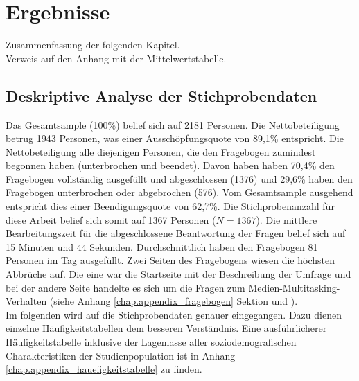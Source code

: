 %
%
\let\raggedsection\centering 
\chapter{Ergebnisse}
\let\raggedsection\raggedright 
\glsresetall
Zusammenfassung der folgenden Kapitel.\\
Verweis auf den Anhang mit der Mittelwertstabelle.
\section{Deskriptive Analyse der Stichprobendaten}
\label{label.stichprobe}
Das Gesamtsample (100\%) belief sich auf 2181 Personen. Die Nettobeteiligung betrug 1943 Personen, was einer Ausschöpfungsquote von 89,1\% entspricht. Die Nettobeteiligung alle diejenigen Personen, die den Fragebogen zumindest begonnen haben (unterbrochen und beendet). Davon haben haben 70,4\% den Fragebogen vollständig ausgefüllt und abgeschlossen (1376) und 29,6\% haben den Fragebogen unterbrochen oder abgebrochen (576). Vom Gesamtsample ausgehend entspricht dies einer Beendigungsquote von 62,7\%. Die Stichprobenanzahl für diese Arbeit belief sich somit auf 1367 Personen ($N = 1367$). Die mittlere Bearbeitungszeit für die abgeschlossene Beantwortung der Fragen belief sich auf 15 Minuten und 44 Sekunden. Durchschnittlich haben den Fragebogen 81 Personen im Tag ausgefüllt. Zwei Seiten des Fragebogens wiesen die höchsten Abbrüche auf. Die eine war die Startseite mit der Beschreibung der Umfrage und bei der andere Seite handelte es sich um die Fragen zum Medien-Multitasking-Verhalten (siehe Anhang \ref{chap.appendix_fragebogen} Sektion  und ). \\
Im folgenden wird auf die Stichprobendaten genauer eingegangen. Dazu dienen einzelne Häufigkeitstabellen dem besseren Verständnis. Eine ausführlicherer Häufigkeitstabelle inklusive der Lagemasse aller soziodemografischen Charakteristiken der Studienpopulation  ist in Anhang \ref{chap.appendix_hauefigkeitstabelle} zu finden.
